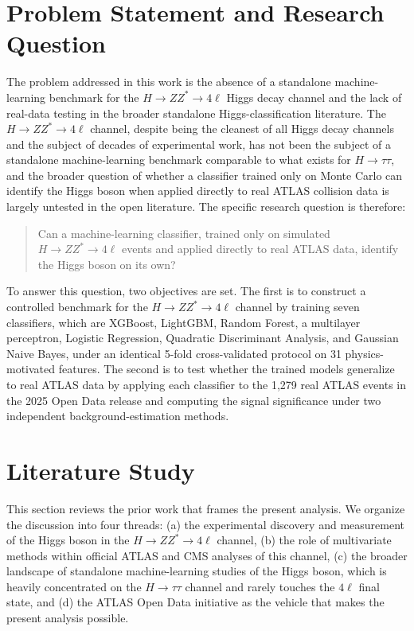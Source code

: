 \documentclass[conference]{IEEEtran}
\begin{document}
{\section{Problem Statement and Research Question}
The problem addressed in this work is the absence of a standalone machine-learning benchmark for the $H \rightarrow ZZ^{*} \rightarrow 4\ell$ Higgs decay channel and the lack of real-data testing in the broader standalone Higgs-classification literature. The $H \rightarrow ZZ^{*} \rightarrow 4\ell$ channel, despite being the cleanest of all Higgs decay channels and the subject of decades of experimental work, has not been the subject of a standalone machine-learning benchmark comparable to what exists for $H \rightarrow \tau\tau$, and the broader question of whether a classifier trained only on Monte Carlo can identify the Higgs boson when applied directly to real ATLAS collision data is largely untested in the open literature. The specific research question is therefore:

\begin{quote}
Can a machine-learning classifier, trained only on simulated $H \rightarrow ZZ^{*} \rightarrow 4\ell$ events and applied directly to real ATLAS data, identify the Higgs boson on its own?
\end{quote}

To answer this question, two objectives are set. The first is to construct a controlled benchmark for the $H \rightarrow ZZ^{*} \rightarrow 4\ell$ channel by training seven classifiers, which are XGBoost, LightGBM, Random Forest, a multilayer perceptron, Logistic Regression, Quadratic Discriminant Analysis, and Gaussian Naive Bayes, under an identical 5-fold cross-validated protocol on 31 physics-motivated features. The second is to test whether the trained models generalize to real ATLAS data by applying each classifier to the 1,279 real ATLAS events in the 2025 Open Data release and computing the signal significance under two independent background-estimation methods.

\section*{Literature Study}
 
This section reviews the prior work that frames the present analysis. We organize the discussion into four threads: (a) the experimental discovery and measurement of the Higgs boson in the $H \rightarrow ZZ^{*} \rightarrow 4\ell$ channel, (b) the role of multivariate methods within official ATLAS and CMS analyses of this channel, (c) the broader landscape of standalone machine-learning studies of the Higgs boson, which is heavily concentrated on the $H \rightarrow \tau\tau$ channel and rarely touches the $4\ell$ final state, and (d) the ATLAS Open Data initiative as the vehicle that makes the present analysis possible.
 
}
\end{document}
